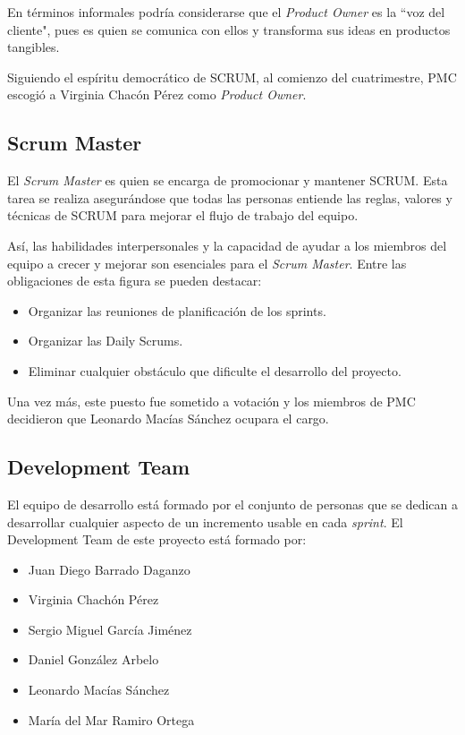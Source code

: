 \documentclass[12pt,a4paper,openright]{book}
\begin{document}
En términos informales podría considerarse que el \textit{Product Owner} es la ``voz del cliente", pues es quien se comunica con ellos y transforma sus ideas en productos tangibles.

Siguiendo el espíritu democrático de SCRUM, al comienzo del cuatrimestre, PMC escogió a Virginia Chacón Pérez como \textit{Product Owner}.

\subsection{Scrum Master}
El \textit{Scrum Master} es quien se encarga de promocionar y mantener  SCRUM. Esta tarea se realiza asegurándose que todas las personas entiende las reglas, valores y técnicas de SCRUM para mejorar el flujo de trabajo del equipo.

Así, las habilidades interpersonales y la capacidad de ayudar a los miembros del equipo a crecer y mejorar son esenciales para el \textit{Scrum Master}. Entre las obligaciones de esta figura se pueden destacar:
\begin{itemize}
\item Organizar las reuniones de planificación de los sprints.
\item Organizar las Daily Scrums.
\item Eliminar cualquier obstáculo que dificulte el desarrollo del proyecto.
\end{itemize}

Una vez más, este puesto fue sometido a votación y los miembros de PMC decidieron que Leonardo Macías Sánchez ocupara el cargo.

\subsection{Development Team}
El equipo de desarrollo está formado por el conjunto de personas que se dedican a desarrollar cualquier aspecto de un incremento usable en cada \textit{sprint}. El Development Team de este proyecto está formado por:
\begin{itemize}
\item Juan Diego Barrado Daganzo
\item Virginia Chachón Pérez
\item Sergio Miguel García Jiménez
\item Daniel González Arbelo
\item Leonardo Macías Sánchez
\item María del Mar Ramiro Ortega
\end{itemize}
\end{document}
